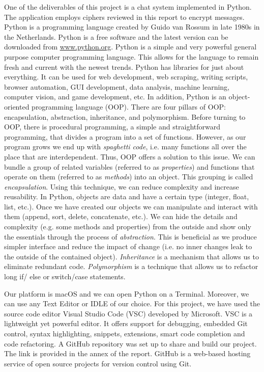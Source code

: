 One of the deliverables of this project is a chat system implemented in Python. The application employs ciphers reviewed in this report to encrypt messages. Python is a programming language created by Guido van Rossum in late 1980s in the Netherlands. Python is a free software and the latest version can be downloaded from \url{www.python.org}. Python is a simple and very powerful general purpose computer programming language. This allows for the language to remain fresh and current with the newest trends. Python has libraries for just about everything. It can be used for web development, web scraping, writing scripts, browser automation, GUI development, data analysis, machine learning, computer vision, and game development, etc. In addition, Python is an object-oriented programming language (OOP). There are four pillars of OOP: encapsulation, abstraction, inheritance, and polymorphism. Before turning to OOP, there is procedural programming, a simple and straightforward programming, that divides a program into a set of functions. However, as our program grows we end up with \emph{spaghetti code}, i.e. many functions all over the place that are interdependent. Thus, OOP offers a solution to this issue. We can bundle a group of related variables (referred to as \emph{properties}) and functions that operate on them (referred to as \emph{methods}) into an object. This grouping is called \emph{encapsulation}. Using this technique, we can reduce complexity and increase reusability. In Python, objects are data and have a certain type (integer, float, list, etc.). Once we have created our objects we can manipulate and interact with them (append, sort, delete, concatenate, etc.). We can hide the details and complexity (e.g. some methods and properties) from the outside and show only the essentials through the process of \emph{abstraction}. This is beneficial as we produce simpler interface and reduce the impact of change (i.e. no inner changes leak to the outside of the contained object). \emph{Inheritance} is a mechanism that allows us to eliminate redundant code. \emph{Polymorphism} is a technique that allows us to refactor long if/ else or switch/case statements. 

Our platform is macOS and we can open Python on a Terminal. Moreover, we can use any Text Editor or IDLE of our choice. For this project, we have used the source code editor Visual Studio Code (VSC) developed by Microsoft. VSC is a lightweight yet powerful editor. It offers support for debugging, embedded Git control, syntax highlighting, snippets, extensions, smart code completion and code refactoring. A GitHub repository was set up to share and build our project. The link is provided in the annex of the report. GitHub is a web-based hosting service of open source projects for version control using Git. 

